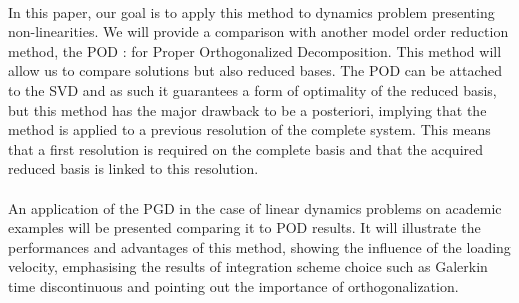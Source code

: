 \paragraph*{}
In this paper, our goal is to apply this method to dynamics problem presenting non-linearities. We will provide a comparison with another model order reduction method, the POD \cite{Chatterjee} : for Proper Orthogonalized Decomposition. This method will allow us to compare solutions but also reduced bases. The POD can be attached to the SVD and as such it guarantees a form of optimality of the reduced basis, but this method has the major drawback to be a posteriori, implying that the method is applied to a previous resolution of the complete system. This means that a first resolution is required on the complete basis and that the acquired reduced basis is linked to this resolution.
\paragraph*{}
An application of the PGD in the case of linear dynamics problems on academic examples will be presented comparing it to POD results. It will illustrate the performances and advantages of this method, showing the influence of the loading velocity, emphasising the results of integration scheme choice such as Galerkin time discontinuous \cite{GDDisc} and pointing out the importance of orthogonalization.
